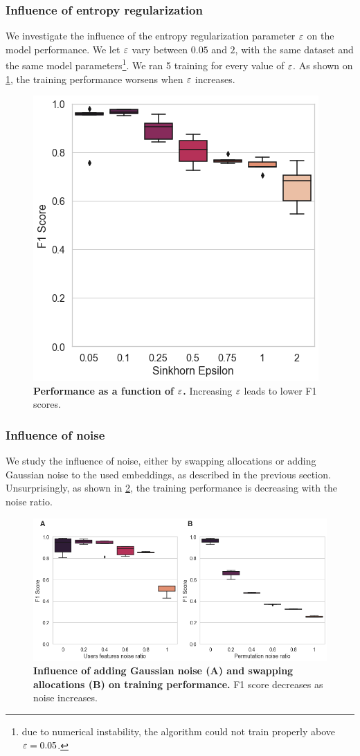 \subsubsection*{Influence of entropy regularization}
We investigate the influence of the entropy regularization parameter $\varepsilon$ on
the model performance. We let $\varepsilon$ vary between $0.05$ and $2$, with the same
dataset and the same model parameters\footnote{due to numerical instability, the
    algorithm could not train properly above $\varepsilon = 0.05$.}. We ran 5 training for
every value of $\varepsilon$. As shown on \cref{fig:experiment_epsilon}, the training
performance worsens when $\varepsilon$ increases.

\begin{figure}[h]
    \centering
    \includegraphics[width=.45\columnwidth]{images/simca/experiment_epsilon_boxplot.png}
    \caption{ \textbf{Performance as a function of $\varepsilon$.} Increasing $\varepsilon$
        leads to lower F1 scores. }
    \label{fig:experiment_epsilon}
\end{figure}

\subsubsection*{Influence of noise}
We study the influence of noise, either by swapping allocations or adding
Gaussian noise to the used embeddings, as described in the previous section.
Unsurprisingly, as shown in \cref{fig:experiment_noise}, the training
performance is decreasing with the noise ratio.

\begin{figure}[h]
    \centering
    \includegraphics[width=.9\columnwidth]{images/simca/experiment_noise_boxplot.png}
    \caption{ \textbf{Influence of adding Gaussian noise (A) and swapping
            allocations (B) on training performance.} F1 score decreases as noise
        increases. }
    \label{fig:experiment_noise}
\end{figure}

